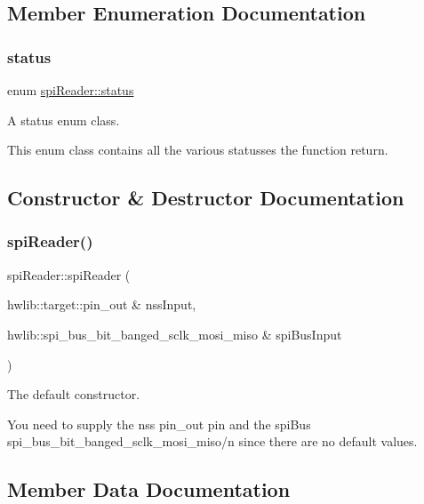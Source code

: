 \subsection{Member Enumeration Documentation}
\mbox{\label{classspiReader_a4bcf984823c38cf4841ebf619e788790}} 
\subsubsection{\texorpdfstring{status}{status}}
{\footnotesize\ttfamily enum \hyperlink{classspiReader_a4bcf984823c38cf4841ebf619e788790}{spi\+Reader\+::status}\hspace{0.3cm}{\ttfamily [strong]}}



A status enum class. 

This enum class contains all the various statusses the function return. 

\subsection{Constructor \& Destructor Documentation}
\mbox{\label{classspiReader_af8eca236eb5cfe4e806f0151227e42b4}} 
\subsubsection{\texorpdfstring{spi\+Reader()}{spiReader()}}
{\footnotesize\ttfamily spi\+Reader\+::spi\+Reader (\begin{DoxyParamCaption}\item[{hwlib\+::target\+::pin\+\_\+out \&}]{nss\+Input,  }\item[{hwlib\+::spi\+\_\+bus\+\_\+bit\+\_\+banged\+\_\+sclk\+\_\+mosi\+\_\+miso \&}]{spi\+Bus\+Input }\end{DoxyParamCaption})}



The default constructor. 

You need to supply the nss pin\+\_\+out pin and the spi\+Bus spi\+\_\+bus\+\_\+bit\+\_\+banged\+\_\+sclk\+\_\+mosi\+\_\+miso/n since there are no default values. 

\subsection{Member Data Documentation}
\mbox{\label{classspiReader_a2a241a80ce921c4df38b3080d839850f}} 
